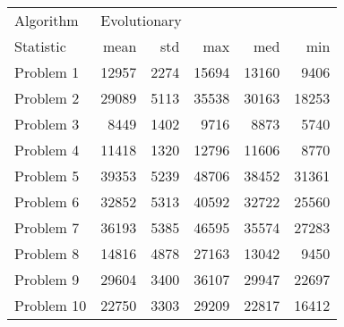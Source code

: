 \begin{tabular}{lrrrrr}
\toprule
Algorithm & \multicolumn{5}{l}{Evolutionary} \\
Statistic &         mean &   std &    max &    med &    min \\
\midrule
Problem 1  &        12957 &  2274 &  15694 &  13160 &   9406 \\
Problem 2  &        29089 &  5113 &  35538 &  30163 &  18253 \\
Problem 3  &         8449 &  1402 &   9716 &   8873 &   5740 \\
Problem 4  &        11418 &  1320 &  12796 &  11606 &   8770 \\
Problem 5  &        39353 &  5239 &  48706 &  38452 &  31361 \\
Problem 6  &        32852 &  5313 &  40592 &  32722 &  25560 \\
Problem 7  &        36193 &  5385 &  46595 &  35574 &  27283 \\
Problem 8  &        14816 &  4878 &  27163 &  13042 &   9450 \\
Problem 9  &        29604 &  3400 &  36107 &  29947 &  22697 \\
Problem 10 &        22750 &  3303 &  29209 &  22817 &  16412 \\
\bottomrule
\end{tabular}
